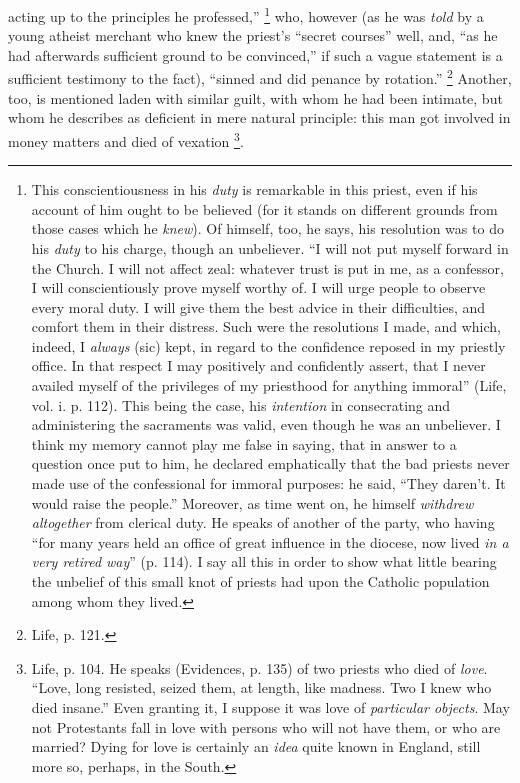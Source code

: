 acting up to the principles he professed,'' \footnote{This conscientiousness in his \emph{duty}
is remarkable in this priest, even if his account of him
ought to be believed (for it stands on different grounds
from those cases which he \emph{knew}). Of himself,
too, he says, his resolution was to do his \emph{duty}
to his charge, though an unbeliever. ``I will not put
myself forward in the Church. I will not affect zeal:
whatever trust is put in me, as a confessor, I will
conscientiously prove myself worthy of. I will urge
people to observe every moral duty. I will give them the
best advice in their difficulties, and comfort them in
their distress. Such were the resolutions I made, and
which, indeed, I \emph{always} (sic) kept, in regard to
the confidence reposed in my priestly office. In that
respect I may positively and confidently assert, that I
never availed myself of the privileges of my priesthood
for anything immoral'' (Life, vol. i. p. 112). This
being the case, his \emph{intention} in consecrating
and administering the sacraments was valid, even though
he was an unbeliever. I think my memory cannot play me
false in saying, that in answer to a question once put to
him, he declared emphatically that the bad priests never
made use of the confessional for immoral purposes: he
said, ``They daren't. It would raise the
people.'' Moreover, as time went on, he himself \emph{withdrew
altogether} from clerical duty. He speaks of another
of the party, who having ``for many years held an
office of great influence in the diocese, now lived \emph{in
a very retired way}'' (p. 114). I say all this in
order to show what little bearing the unbelief of this
small knot of priests had upon the Catholic population
among whom they lived.} who,
however (as he was \emph{told} by a young atheist merchant who
knew the priest's ``secret courses'' well, and,
``as he had afterwards sufficient ground to be
convinced,'' if such a vague statement is a
sufficient testimony to the fact), ``sinned and did
penance by rotation.'' \footnote{Life, p. 121.} Another, too,
is mentioned laden with similar guilt, with whom he had
been intimate, but whom he describes as deficient in mere
natural principle: this man got involved in money matters
and died of vexation \footnote{Life, p. 104. He speaks
(Evidences, p. 135) of two priests who died of \emph{love}.
``Love, long resisted, seized them, at length, like
madness. Two I knew who died insane.'' Even granting
it, I suppose it was love of \emph{particular objects}.
May not Protestants fall in love with persons who will
not have them, or who are married? Dying for love is
certainly an \emph{idea} quite known in England, still
more so, perhaps, in the South.}.

